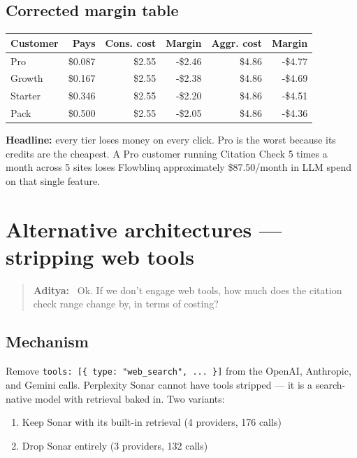 \documentclass[11pt,letterpaper]{article}
\newenvironment{userturn}
  {\begin{quote}\small\color{brand}\textbf{Aditya:}~}
  {\end{quote}}
\newcommand{\costneg}[1]{\textcolor{warn}{#1}}
\begin{document}
\subsection{Corrected margin table}

\begin{center}
\begin{tabular}{@{}lrrrrr@{}}
\toprule
\textbf{Customer} & \textbf{Pays} & \textbf{Cons. cost} & \textbf{Margin} & \textbf{Aggr. cost} & \textbf{Margin} \\
\midrule
Pro     & \$0.087 & \$2.55 & \costneg{-\$2.46} & \$4.86 & \costneg{-\$4.77} \\
Growth  & \$0.167 & \$2.55 & \costneg{-\$2.38} & \$4.86 & \costneg{-\$4.69} \\
Starter & \$0.346 & \$2.55 & \costneg{-\$2.20} & \$4.86 & \costneg{-\$4.51} \\
Pack    & \$0.500 & \$2.55 & \costneg{-\$2.05} & \$4.86 & \costneg{-\$4.36} \\
\bottomrule
\end{tabular}
\end{center}

\textbf{Headline:} every tier loses money on every click. Pro is the worst
because its credits are the cheapest. A Pro customer running Citation Check
5 times a month across 5 sites loses Flowblinq approximately \$87.50/month in
LLM spend on that single feature.

\section{Alternative architectures --- stripping web tools}

\begin{userturn}
Ok. If we don't engage web tools, how much does the citation check range
change by, in terms of costing?
\end{userturn}

\subsection{Mechanism}

Remove \texttt{tools: [\{ type: "web\_search", ... \}]} from the OpenAI,
Anthropic, and Gemini calls. Perplexity Sonar cannot have tools stripped ---
it is a search-native model with retrieval baked in. Two variants:

\begin{enumerate}[nosep]
  \item Keep Sonar with its built-in retrieval (4 providers, 176 calls)
  \item Drop Sonar entirely (3 providers, 132 calls)
\end{enumerate}
\end{document}
